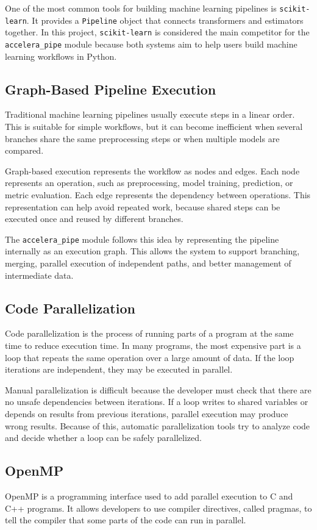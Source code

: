 \documentclass[12pt,a4paper]{report}
\begin{document}
One of the most common tools for building machine learning pipelines is
\texttt{scikit-learn}. It provides a \texttt{Pipeline} object that connects
transformers and estimators together. In this project, \texttt{scikit-learn} is
considered the main competitor for the \texttt{accelera\_pipe} module because
both systems aim to help users build machine learning workflows in Python.

\subsection{Graph-Based Pipeline Execution}
Traditional machine learning pipelines usually execute steps in a linear order.
This is suitable for simple workflows, but it can become inefficient when several
branches share the same preprocessing steps or when multiple models are compared.

Graph-based execution represents the workflow as nodes and edges. Each node
represents an operation, such as preprocessing, model training, prediction, or
metric evaluation. Each edge represents the dependency between operations. This
representation can help avoid repeated work, because shared steps can be
executed once and reused by different branches.

The \texttt{accelera\_pipe} module follows this idea by representing the
pipeline internally as an execution graph. This allows the system to support
branching, merging, parallel execution of independent paths, and better
management of intermediate data.

\subsection{Code Parallelization}
Code parallelization is the process of running parts of a program at the same
time to reduce execution time. In many programs, the most expensive part is a
loop that repeats the same operation over a large amount of data. If the loop
iterations are independent, they may be executed in parallel.

Manual parallelization is difficult because the developer must check that there
are no unsafe dependencies between iterations. If a loop writes to shared
variables or depends on results from previous iterations, parallel execution may
produce wrong results. Because of this, automatic parallelization tools try to
analyze code and decide whether a loop can be safely parallelized.

\subsection{OpenMP}
OpenMP is a programming interface used to add parallel execution to C and C++
programs. It allows developers to use compiler directives, called pragmas, to
tell the compiler that some parts of the code can run in parallel.
\end{document}
